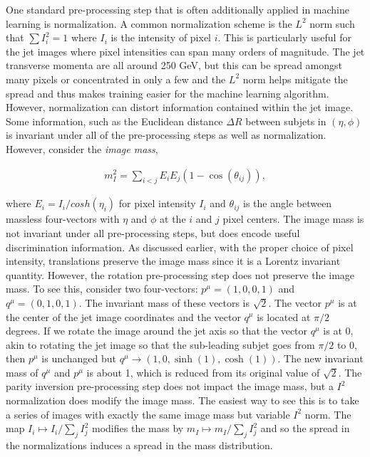 One standard pre-processing step that is often additionally applied in machine learning is normalization.  A common normalization scheme is the $L^2$ norm such that $\sum I_i^2=1$ where $I_i$ is the intensity of pixel $i$.  This is particularly useful for the jet images where pixel intensities can span many orders of magnitude.  The jet transverse momenta are all around 250 GeV, but this can be spread amongst many pixels or concentrated in only a few and the $L^2$ norm helps mitigate the spread and thus makes training easier for the machine learning algorithm.  However, normalization can distort information contained within the jet image.  Some information, such as the Euclidean distance $\Delta R$ between subjets in $(\eta,\phi)$ is invariant under all of the pre-processing steps as well as normalization.  However, consider the {\it image mass}, 

\begin{align}
m_I^2=\sum_{i<j} E_iE_j(1-\cos(\theta_{ij})),
\end{align}

\noindent where $E_i=I_i/cosh(\eta_i)$ for pixel intensity $I_i$ and $\theta_{ij}$ is the angle between massless four-vectors with $\eta$ and $\phi$ at the $i$ and $j$ pixel centers.  The image mass is not invariant under all pre-processing steps, but does encode useful discrimination information.  As discussed earlier, with the proper choice of pixel intensity, translations preserve the image mass since it is a Lorentz invariant quantity.  However, the rotation pre-processing step does not preserve the image mass.  To see this, consider two four-vectors: $p^\mu=(1,0,0,1)$ and $q^\mu=(0,1,0,1)$.   The invariant mass of these vectors is $\sqrt{2}$.  The vector $p^\mu$ is at the center of the jet image coordinates and the vector $q^\mu$ is located at $\pi/2$ degrees.  If we rotate the image around the jet axis so that the vector $q^\mu$ is at $0$, akin to rotating the jet image so that the sub-leading subjet goes from $\pi/2$ to $0$, then $p^\mu$ is unchanged but $q^\mu\rightarrow (1,0,\sinh(1),\cosh(1))$.  The new invariant mass of $q^\mu$ and $p^\mu$ is about 1, which is reduced from its original value of $\sqrt{2}$.  The parity inversion pre-processing step does not impact the image mass, but a $I^2$ normalization does modify the image mass.  The easiest way to see this is to take a series of images with exactly the same image mass but variable $I^2$ norm.  The map $I_i\mapsto I_i/\sum_j I_j^2$ modifies the mass by $m_I\mapsto m_I/\sum_j I_j^2$ and so the spread in the normalizations induces a spread in the mass distribution.


